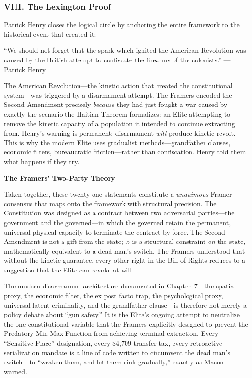 \documentclass[12pt,openany]{book}
\begin{document}
\subsubsection*{VIII. The Lexington Proof}

Patrick Henry closes the logical circle by anchoring the entire framework to the historical event that created it:

\begin{historicalsource}
``We should not forget that the spark which ignited the American Revolution was caused by the British attempt to confiscate the firearms of the colonists.'' \hfill ---Patrick Henry
\end{historicalsource}

The American Revolution---the kinetic action that created the constitutional system---was triggered by a disarmament attempt. The Framers encoded the Second Amendment precisely \textit{because} they had just fought a war caused by exactly the scenario the Haitian Theorem formalizes: an Elite attempting to remove the kinetic capacity of a population it intended to continue extracting from. Henry's warning is permanent: disarmament \textit{will} produce kinetic revolt. This is why the modern Elite uses gradualist methods---grandfather clauses, economic filters, bureaucratic friction---rather than confiscation. Henry told them what happens if they try.

\medskip
\noindent\textbf{The Framers' Two-Party Theory}

\medskip
Taken together, these twenty-one statements constitute a \textit{unanimous} Framer consensus that maps onto the framework with structural precision. The Constitution was designed as a contract between two adversarial parties---the government and the governed---in which the governed retain the permanent, universal physical capacity to terminate the contract by force. The Second Amendment is not a gift from the state; it is a structural constraint \textit{on} the state, mathematically equivalent to a dead man's switch. The Framers understood that without the kinetic guarantee, every other right in the Bill of Rights reduces to a suggestion that the Elite can revoke at will.

The modern disarmament architecture documented in Chapter~7---the spatial proxy, the economic filter, the ex post facto trap, the psychological proxy, universal latent criminality, and the grandfather clause---is therefore not merely a policy debate about ``gun safety.'' It is the Elite's ongoing attempt to neutralize the one constitutional variable that the Framers explicitly designed to prevent the Predatory Min-Max Function from achieving terminal extraction. Every ``Sensitive Place'' designation, every \$4,709 transfer tax, every retroactive serialization mandate is a line of code written to circumvent the dead man's switch---to ``weaken them, and let them sink gradually,'' exactly as Mason warned.
\end{document}
